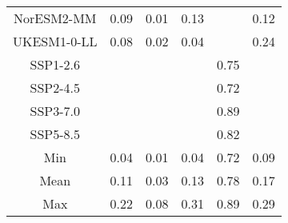\begin{table*}[t]
\begin{tabular}{c|rrr|rr}
NorESM2-MM & 0.09 & 0.01 & 0.13 &  & 0.12 \\
UKESM1-0-LL & 0.08 & 0.02 & 0.04 &  & 0.24 \\
SSP1-2.6 &  &  &  & 0.75 &  \\
SSP2-4.5 &  &  &  & 0.72 &  \\
SSP3-7.0 &  &  &  & 0.89 &  \\
SSP5-8.5 &  &  &  & 0.82 &  \\
\midrule
Min & 0.04 & 0.01 & 0.04 & 0.72 & 0.09 \\
Mean & 0.11 & 0.03 & 0.13 & 0.78 & 0.17 \\
Max & 0.22 & 0.08 & 0.31 & 0.89 & 0.29 \\
\bottomrule
\end{tabular}
\end{table*}
